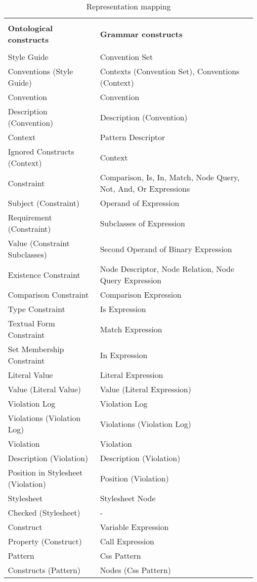 \begin{table}[t]
\begin{center}
\begin{longtable}{ | p{20em} | p{20em} | } 
\hline
 &  \\
\textbf{Ontological constructs} & \textbf{Grammar constructs} \\
 &  \\
\hline
Style Guide & Convention Set \\ \hline
Conventions (Style Guide) & Contexts (Convention Set), Conventions (Context) \\ \hline
Convention & Convention \\ \hline
Description (Convention) & Description (Convention) \\ \hline
Context & Pattern Descriptor \\ \hline
Ignored Constructs (Context) &  Context \\ \hline

Constraint & Comparison, Is, In, Match, Node Query, Not, And, Or Expressions \\ \hline
Subject (Constraint) & Operand of Expression \\ \hline
Requirement (Constraint) & Subclasses of Expression \\ \hline
Value (Constraint Subclasses) & Second Operand of Binary Expression \\ \hline
Existence Constraint & Node Descriptor, Node Relation, Node Query Expression \\ \hline
Comparison Constraint & Comparison Expression \\ \hline
Type Constraint & Is Expression \\ \hline
Textual Form Constraint & Match Expression \\ \hline
Set Membership Constraint & In Expression \\ \hline
Literal Value & Literal Expression \\ \hline
Value (Literal Value) & Value (Literal Expression) \\ \hline

Violation Log & Violation Log \\ \hline
Violations (Violation Log) & Violations (Violation Log) \\ \hline
Violation & Violation \\ \hline
Description (Violation) & Description (Violation) \\ \hline
Position in Stylesheet (Violation) & Position (Violation) \\ \hline

Stylesheet & Stylesheet Node \\ \hline
Checked (Stylesheet) & - \\ \hline
Construct & Variable Expression \\ \hline
Property (Construct) & Call Expression \\ \hline
Pattern & Css Pattern \\ \hline
Constructs (Pattern) & Nodes (Css Pattern) \\ \hline
\end{longtable}
\end{center}
\caption{
	\label{tab:representation}
	Representation mapping}
\end{table}
